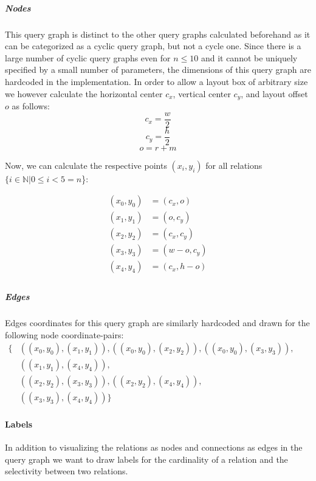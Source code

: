 \subparagraph{Nodes} This query graph is distinct to the other query graphs calculated beforehand as it can be categorized as a cyclic query graph, but not a cycle one. Since there is a large number of cyclic query graphs even for $n \leq 10$ and it cannot be uniquely specified by a small number of parameters, the dimensions of this query graph are hardcoded in the implementation. In order to allow a layout box of arbitrary size we however calculate the horizontal center $c_x$, vertical center $c_y$, and layout offset $o$ as follows:
\begin{equation}
    c_x = \frac{w}{2}
\end{equation}
\begin{equation}
    c_y = \frac{h}{2}
\end{equation}
\begin{equation}
    o = r + m
\end{equation}

Now, we can calculate the respective points $(x_i, y_i)$ for all relations $\{i \in \mathbb{N} \vert 0 \leq i < 5 = n$\}:

\begin{equation}
    \begin{aligned}
        (x_0, y_0) &= (c_x,o)\\
        (x_1, y_1) &= (o,c_y)\\
        (x_2, y_2) &= (c_x,c_y)\\
        (x_3, y_3) &= (w-o,c_y)\\
        (x_4, y_4) &= (c_x,h-o)\\
    \end{aligned}
\end{equation}

\subparagraph{Edges}
Edges coordinates for this query graph are similarly hardcoded and drawn for the following node coordinate-pairs:\\

$
\begin{aligned}
    \{& ((x_0,y_0), (x_1, y_1)), ((x_0, y_0), (x_2, y_2)), ((x_0, y_0), (x_3,y_3)),\\
      & ((x_1, y_1),(x_4, y_4)),\\
      & ((x_2, y_2),(x_3, y_3)), ((x_2,y_2),(x_4, y_4)),\\
      & ((x_3, y_3),(x_4, y_4)) \}    
\end{aligned}
$

\paragraph{Labels}
In addition to visualizing the relations as nodes and connections as edges in the query graph we want to draw labels for the cardinality of a relation and the selectivity between two relations.

